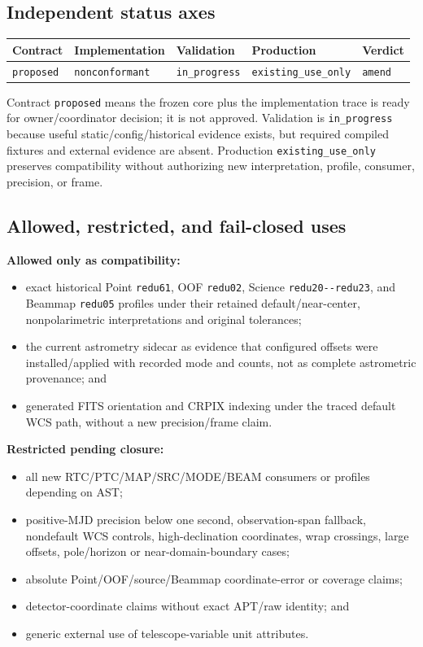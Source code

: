 \documentclass[11pt]{article}
\newcommand{\code}[1]{\nolinkurl{#1}}
\newcommand{\status}[1]{\nolinkurl{#1}}
\begin{document}
\subsection{Independent status axes}

\begin{center}
\begin{tabular}{lllll}
\toprule
Contract & Implementation & Validation & Production & Verdict \\
\midrule
\status{proposed} & \status{nonconformant} & \status{in_progress} &
\status{existing_use_only} & \status{amend} \\
\bottomrule
\end{tabular}
\end{center}

Contract \status{proposed} means the frozen core plus the implementation trace
is ready for owner/coordinator decision; it is not approved. Validation is
\status{in_progress} because useful static/config/historical evidence exists,
but required compiled fixtures and external evidence are absent. Production
\status{existing_use_only} preserves compatibility without authorizing new
interpretation, profile, consumer, precision, or frame.

\subsection{Allowed, restricted, and fail-closed uses}

\textbf{Allowed only as compatibility:}

\begin{itemize}
\item exact historical Point \code{redu61}, OOF \code{redu02}, Science
\code{redu20--redu23}, and Beammap \code{redu05} profiles under their retained
default/near-center, nonpolarimetric interpretations and original tolerances;
\item the current astrometry sidecar as evidence that configured offsets were
installed/applied with recorded mode and counts, not as complete astrometric
provenance; and
\item generated FITS orientation and CRPIX indexing under the traced default
WCS path, without a new precision/frame claim.
\end{itemize}

\textbf{Restricted pending closure:}

\begin{itemize}
\item all new RTC/PTC/MAP/SRC/MODE/BEAM consumers or profiles depending on AST;
\item positive-MJD precision below one second, observation-span fallback,
nondefault WCS controls, high-declination coordinates, wrap crossings, large
offsets, pole/horizon or near-domain-boundary cases;
\item absolute Point/OOF/source/Beammap coordinate-error or coverage claims;
\item detector-coordinate claims without exact APT/raw identity; and
\item generic external use of telescope-variable unit attributes.
\end{itemize}
\end{document}
